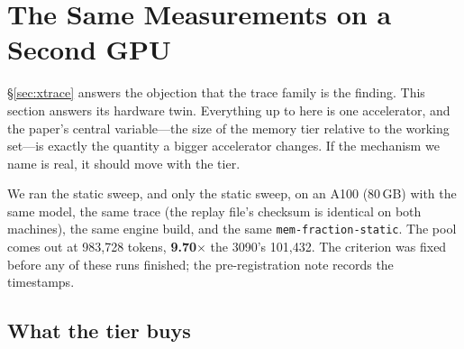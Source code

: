 
\section{The Same Measurements on a Second GPU}
\label{sec:a100}

\S\ref{sec:xtrace} answers the objection that the trace family is the finding.
This section answers its hardware twin. Everything up to here is one
accelerator, and the paper's central variable---the size of the memory tier
relative to the working set---is exactly the quantity a bigger accelerator
changes. If the mechanism we name is real, it should move with the tier.

We ran the static sweep, and only the static sweep, on an A100 (80\,GB) with
the same model, the same trace (the replay file's checksum is identical on both
machines), the same engine build, and the same \texttt{mem-fraction-static}.
The pool comes out at 983{,}728 tokens, \textbf{9.70$\times$} the 3090's
101{,}432. The criterion was fixed before any of these runs finished; the
pre-registration note records the timestamps.

\subsection{What the tier buys}

